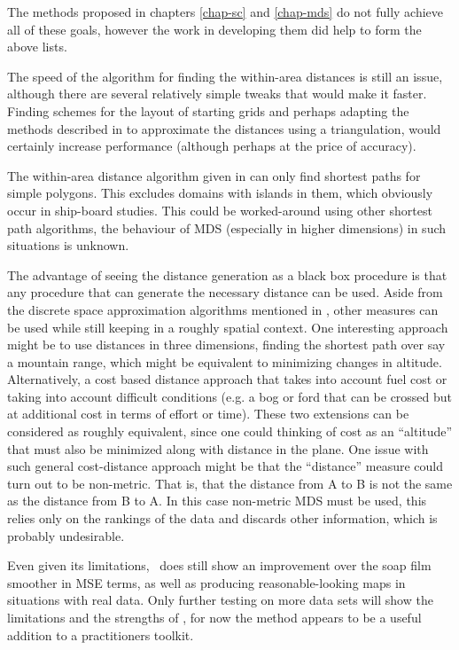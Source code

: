 The methods proposed in chapters \ref{chap-sc} and \ref{chap-mds} do not fully achieve all of these goals, however the work in developing them did help to form the above lists. 

The speed of the algorithm for finding the within-area distances is still an issue, although there are several relatively simple tweaks that would make it faster. Finding schemes for the layout of starting grids and perhaps adapting the methods described in  to approximate the distances using a triangulation, would certainly increase performance (although perhaps at the price of accuracy).

The within-area distance algorithm given in  can only find shortest paths for simple polygons. This excludes domains with islands in them, which obviously occur in ship-board studies. This could be worked-around using other shortest path algorithms, the behaviour of MDS (especially in higher dimensions) in such situations is unknown.

The advantage of seeing the distance generation as a black box procedure is that any procedure that can generate the necessary distance can be used. Aside from the discrete space approximation algorithms mentioned in , other measures can be used while still keeping in a roughly spatial context. One interesting approach might be to use distances in three dimensions, finding the shortest path over say a mountain range, which might be equivalent to minimizing changes in altitude. Alternatively, a cost based distance approach that takes into account fuel cost or taking into account difficult conditions (e.g. a bog or ford that can be crossed but at additional cost in terms of effort or time). These two extensions can be considered as roughly equivalent, since one could thinking of cost as an ``altitude'' that must also be minimized along with distance in the plane. One issue with such general cost-distance approach might be that the ``distance'' measure could turn out to be non-metric. That is, that the distance from A to B is not the same as the distance from B to A. In this case non-metric MDS must be used, this relies only on the rankings of the data and discards other information, which is probably undesirable.

Even given its limitations, \mdsds\ does still show an improvement over the soap film smoother in MSE terms, as well as producing reasonable-looking maps in situations with real data. Only further testing on more data sets will show the limitations and the strengths of \mdsds, for now the method appears to be a useful addition to a practitioners toolkit.

